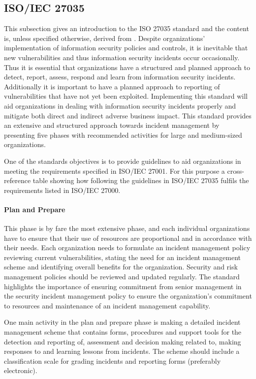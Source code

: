 \subsection{\acs{ISO}/\acs{IEC} 27035}
This subsection gives an introduction to the ISO 27035 standard and the content is, unless specified otherwise, derived from \cite{ISO/IEC27035}. Despite organizations' implementation of information security policies and controls, it is inevitable that new vulnerabilities and thus information security incidents occur occasionally. Thus it is essential that organizations have a structured and planned approach to detect, report, assess, respond and learn from information security incidents. Additionally it is important to have a planned approach to reporting of vulnerabilities that have not yet been exploited. Implementing this standard will aid organizations in dealing with information security incidents properly and mitigate both direct and indirect adverse business impact. This standard provides an extensive and structured approach towards incident management by presenting five phases with recommended activities for large and medium-sized organizations. 

One of the standards objectives is to provide guidelines to aid organizations in meeting the requirements specified in ISO/IEC 27001. For this purpose a cross-reference table showing how following the guidelines in ISO/IEC 27035 fulfils the requirements listed in ISO/IEC 27000.

\paragraph{Plan and Prepare} This phase is by fare the most extensive phase, and each individual organizations have to ensure that their use of resources are proportional and in accordance with their needs. Each organization needs to formulate an incident management policy reviewing current vulnerabilities, stating the need for an incident management scheme and identifying overall benefits for the organization. Security and risk management policies should be reviewed and updated regularly. The standard highlights the importance of ensuring commitment from senior management in the security incident management policy to ensure the organization's commitment to resources and maintenance of an incident management capability.  

One main activity in the plan and prepare phase is making a detailed incident management scheme that contains forms, procedures and support tools for the detection and reporting of, assessment and decision making related to, making responses to and learning lessons from incidents. The scheme should include a classification scale for grading incidents and reporting forms (preferably electronic).   

